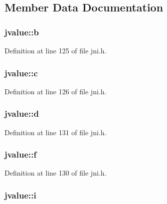 \subsection{Member Data Documentation}
\hypertarget{unionjvalue_aefa3b88020503b525905fb882c70551d}{
\subsubsection[{b}]{ jvalue\-::b}}\label{unionjvalue_aefa3b88020503b525905fb882c70551d}


Definition at line 125 of file jni.\-h.

\hypertarget{unionjvalue_a04e0384cd7775069b0f2b7d0e0ea39c6}{
\subsubsection[{c}]{ jvalue\-::c}}\label{unionjvalue_a04e0384cd7775069b0f2b7d0e0ea39c6}


Definition at line 126 of file jni.\-h.

\hypertarget{unionjvalue_a59e182c81993c48325831f2fa8dc19ca}{
\subsubsection[{d}]{ jvalue\-::d}}\label{unionjvalue_a59e182c81993c48325831f2fa8dc19ca}


Definition at line 131 of file jni.\-h.

\hypertarget{unionjvalue_ad32f5996f5d0f5fb93fb38ef83a74eb0}{
\subsubsection[{f}]{ jvalue\-::f}}\label{unionjvalue_ad32f5996f5d0f5fb93fb38ef83a74eb0}


Definition at line 130 of file jni.\-h.

\hypertarget{unionjvalue_a17b6765ac8cb7d522e35073745faebe2}{
\subsubsection[{i}]{ jvalue\-::i}}\label{unionjvalue_a17b6765ac8cb7d522e35073745faebe2}


